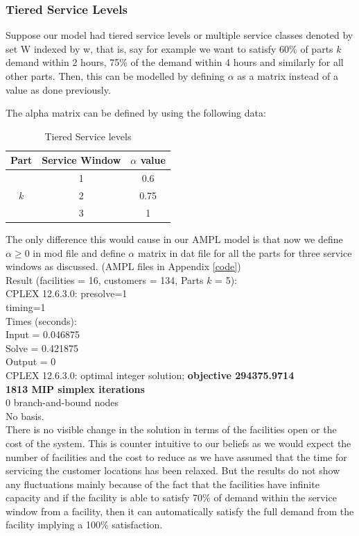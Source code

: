 \documentclass[12pt]{article}
\numberwithin{equation}{section}
\begin{document}
\subsubsection{Tiered Service Levels}
Suppose our model had tiered service levels or multiple service classes denoted by set W indexed by w, that is, say for example we want to satisfy 60\% of parts $k$ demand within 2 hours, 75\% of the demand within 4 hours and similarly for all other parts. Then, this can be modelled by defining $\alpha$ as a matrix instead of a value as done previously. 

The alpha matrix can be defined by using the following data:
\begin{table}[H]
\centering
\caption{Tiered Service levels}
\label{my-label}
\begin{tabular}{|c|c|c|}
\hline
\multicolumn{1}{|l|}{\textbf{Part}} & \multicolumn{1}{l|}{\textbf{Service Window}} & \multicolumn{1}{l|}{\textbf{$\alpha$ value}} \\ \hline
\multirow{3}{*}{$k$} & 1 & 0.6 \\ \cline{2-3} 
 & 2 & 0.75 \\ \cline{2-3} 
 & 3 & 1 \\ \hline
\end{tabular}
\end{table}
The only difference this would cause in our AMPL model is that now we define $\alpha \geq 0$ in mod file and define $\alpha$ matrix in dat file for all the parts for three service windows as discussed. (AMPL files in Appendix \ref{code})\\
Result (facilities = 16, customers = 134, Parts $k$ = 5):\\
CPLEX 12.6.3.0: presolve=1\\
timing=1\\
Times (seconds):\\
Input =  0.046875\\
Solve =  0.421875\\
Output = 0\\
CPLEX 12.6.3.0: optimal integer solution; \textbf{objective 294375.9714}\\
\textbf{1813 MIP simplex iterations}\\
0 branch-and-bound nodes\\
No basis.\\

There is no visible change in the solution in terms of the facilities open or the cost of the system. This is counter intuitive to our beliefs as we would expect the number of facilities and the cost to reduce as we have assumed that the time for servicing the customer locations has been relaxed. But the results do not show any fluctuations mainly because of the fact that the facilities have infinite capacity and if the facility is able to satisfy 70\% of demand within the service window from a facility, then it can automatically satisfy the full demand from the facility implying a 100\% satisfaction.
\end{document}
